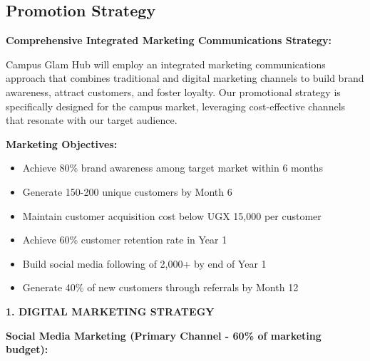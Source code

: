 \documentclass[a4paper,12pt]{article}
\begin{document}
\subsection{Promotion Strategy}

\textbf{Comprehensive Integrated Marketing Communications Strategy:}

Campus Glam Hub will employ an integrated marketing communications approach that combines traditional and digital marketing channels to build brand awareness, attract customers, and foster loyalty. Our promotional strategy is specifically designed for the campus market, leveraging cost-effective channels that resonate with our target audience.

\vspace{1em}

\textbf{Marketing Objectives:}
\begin{itemize}[leftmargin=2em]
    \item Achieve 80\% brand awareness among target market within 6 months
    \item Generate 150-200 unique customers by Month 6
    \item Maintain customer acquisition cost below UGX 15,000 per customer
    \item Achieve 60\% customer retention rate in Year 1
    \item Build social media following of 2,000+ by end of Year 1
    \item Generate 40\% of new customers through referrals by Month 12
\end{itemize}

\vspace{1em}

\textbf{1. DIGITAL MARKETING STRATEGY}

\textbf{Social Media Marketing (Primary Channel - 60\% of marketing budget):}
\end{document}
